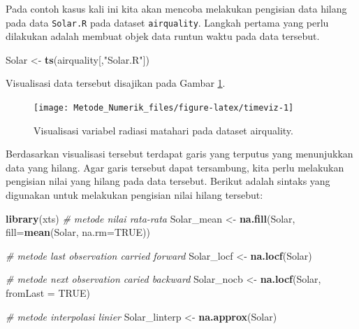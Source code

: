 \documentclass[]{book}
\newenvironment{Shaded}{\begin{snugshade}}{\end{snugshade}}
\newcommand{\CommentTok}[1]{\textcolor[rgb]{0.56,0.35,0.01}{\textit{#1}}}
\newcommand{\DataTypeTok}[1]{\textcolor[rgb]{0.13,0.29,0.53}{#1}}
\newcommand{\KeywordTok}[1]{\textcolor[rgb]{0.13,0.29,0.53}{\textbf{#1}}}
\newcommand{\NormalTok}[1]{#1}
\newcommand{\OtherTok}[1]{\textcolor[rgb]{0.56,0.35,0.01}{#1}}
\newcommand{\StringTok}[1]{\textcolor[rgb]{0.31,0.60,0.02}{#1}}
\theoremstyle{definition}
\theoremstyle{definition}
\theoremstyle{definition}
\theoremstyle{remark}
\begin{document}
Pada contoh kasus kali ini kita akan mencoba melakukan pengisian data hilang pada data \texttt{Solar.R} pada dataset \texttt{airquality}. Langkah pertama yang perlu dilakukan adalah membuat objek data runtun waktu pada data tersebut.

\begin{Shaded}
\begin{Highlighting}[]
\NormalTok{Solar <-}\StringTok{ }\KeywordTok{ts}\NormalTok{(airquality[,}\StringTok{"Solar.R"}\NormalTok{])}
\end{Highlighting}
\end{Shaded}

Visualisasi data tersebut disajikan pada Gambar \ref{fig:timeviz}.

\begin{figure}

{\centering \texttt{[image: Metode\_Numerik\_files/figure-latex/timeviz-1]} 

}

\caption{Visualisasi variabel radiasi matahari pada dataset airquality.}\label{fig:timeviz}
\end{figure}

Berdasarkan visualisasi tersebut terdapat garis yang terputus yang menunjukkan data yang hilang. Agar garis tersebut dapat tersambung, kita perlu melakukan pengisian nilai yang hilang pada data tersebut. Berikut adalah sintaks yang digunakan untuk melakukan pengisian nilai hilang tersebut:

\begin{Shaded}
\begin{Highlighting}[]
\KeywordTok{library}\NormalTok{(xts)}
\CommentTok{# metode nilai rata-rata}
\NormalTok{Solar_mean <-}\StringTok{ }\KeywordTok{na.fill}\NormalTok{(Solar, }\DataTypeTok{fill=}\KeywordTok{mean}\NormalTok{(Solar, }\DataTypeTok{na.rm=}\OtherTok{TRUE}\NormalTok{))}

\CommentTok{# metode last observation carried forward}
\NormalTok{Solar_locf <-}\StringTok{ }\KeywordTok{na.locf}\NormalTok{(Solar)}

\CommentTok{# metode next observation caried backward}
\NormalTok{Solar_nocb <-}\StringTok{ }\KeywordTok{na.locf}\NormalTok{(Solar, }\DataTypeTok{fromLast =} \OtherTok{TRUE}\NormalTok{)}

\CommentTok{# metode interpolasi linier}
\NormalTok{Solar_linterp <-}\StringTok{ }\KeywordTok{na.approx}\NormalTok{(Solar)}
\end{Highlighting}
\end{Shaded}
\end{document}
